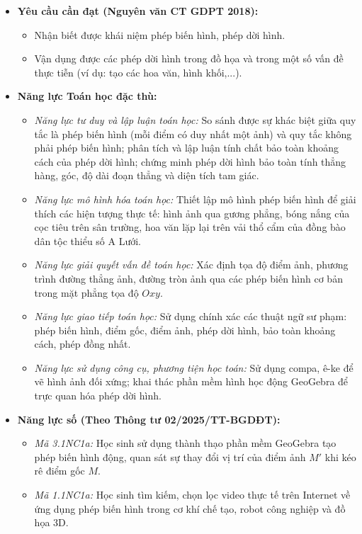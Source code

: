 \documentclass[12pt, a4paper]{article}
\begin{document}
\begin{itemize}[leftmargin=1.2cm]
    \item \textbf{Yêu cầu cần đạt (Nguyên văn CT GDPT 2018):}
    \begin{itemize}[leftmargin=0.6cm]
        \item Nhận biết được khái niệm phép biến hình, phép dời hình.
        \item Vận dụng được các phép dời hình trong đồ họa và trong một số vấn đề thực tiễn (ví dụ: tạo các hoa văn, hình khối,...).
    \end{itemize}

    \item \textbf{Năng lực Toán học đặc thù:}
    \begin{itemize}[leftmargin=0.6cm]
        \item \textit{Năng lực tư duy và lập luận toán học:} So sánh được sự khác biệt giữa quy tắc là phép biến hình (mỗi điểm có duy nhất một ảnh) và quy tắc không phải phép biến hình; phân tích và lập luận tính chất bảo toàn khoảng cách của phép dời hình; chứng minh phép dời hình bảo toàn tính thẳng hàng, góc, độ dài đoạn thẳng và diện tích tam giác.
        \item \textit{Năng lực mô hình hóa toán học:} Thiết lập mô hình phép biến hình để giải thích các hiện tượng thực tế: hình ảnh qua gương phẳng, bóng nắng của cọc tiêu trên sân trường, hoa văn lặp lại trên vải thổ cẩm của đồng bào dân tộc thiểu số A Lưới.
        \item \textit{Năng lực giải quyết vấn đề toán học:} Xác định tọa độ điểm ảnh, phương trình đường thẳng ảnh, đường tròn ảnh qua các phép biến hình cơ bản trong mặt phẳng tọa độ $Oxy$.
        \item \textit{Năng lực giao tiếp toán học:} Sử dụng chính xác các thuật ngữ sư phạm: phép biến hình, điểm gốc, điểm ảnh, phép dời hình, bảo toàn khoảng cách, phép đồng nhất.
        \item \textit{Năng lực sử dụng công cụ, phương tiện học toán:} Sử dụng compa, ê-ke để vẽ hình ảnh đối xứng; khai thác phần mềm hình học động GeoGebra để trực quan hóa phép dời hình.
    \end{itemize}

    \item \textbf{Năng lực số (Theo Thông tư 02/2025/TT-BGDĐT):}
    \begin{itemize}[leftmargin=0.6cm]
        \item \textit{Mã 3.1NC1a:} Học sinh sử dụng thành thạo phần mềm GeoGebra tạo phép biến hình động, quan sát sự thay đổi vị trí của điểm ảnh $M'$ khi kéo rê điểm gốc $M$.
        \item \textit{Mã 1.1NC1a:} Học sinh tìm kiếm, chọn lọc video thực tế trên Internet về ứng dụng phép biến hình trong cơ khí chế tạo, robot công nghiệp và đồ họa 3D.
    \end{itemize}


\end{itemize}
\end{document}
